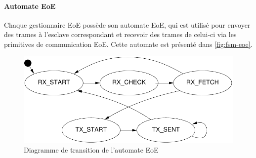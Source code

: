 \documentclass[a4paper,12pt,BCOR6mm,bibtotoc,idxtotoc]{scrbook}
\begin{document}
\paragraph{Automate EoE}

Chaque gestionnaire EoE poss\`ede son automate EoE, qui est utilis\'e pour
envoyer des trames \`a l'esclave correspondant et recevoir des trames
de celui-ci via les primitives de communication EoE. Cette automate
est pr\'esent\'e dans \autoref{fig:fsm-eoe}.

\begin{figure}[htbp]
  \centering
  \includegraphics[width=.7\textwidth]{images/fsm-eoe} %
  \caption{Diagramme de transition de l'automate EoE}
  \label{fig:fsm-eoe}
\end{figure}

\end{document}
